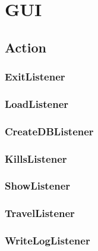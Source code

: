 \section{GUI}

\subsection{Action}

\subsubsection{ExitListener}


\subsubsection{LoadListener}

\subsubsection{CreateDBListener}

\subsubsection{KillsListener}

\subsubsection{ShowListener}

\subsubsection{TravelListener}

\subsubsection{WriteLogListener}